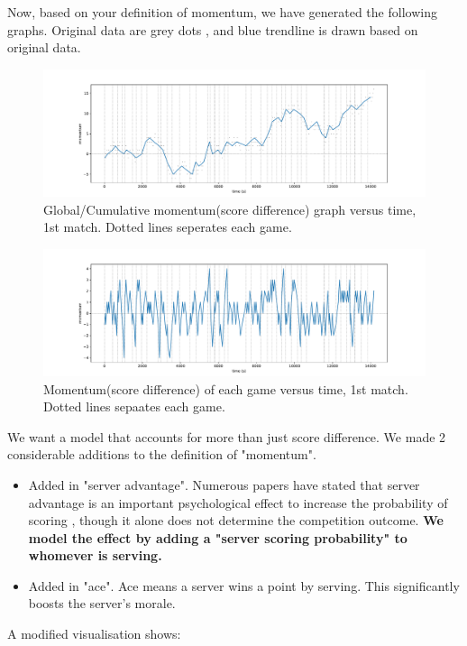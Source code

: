 \documentclass[11pt,a4paper]{article}
\begin{document}
	Now, based on your definition of momentum, we have generated the following graphs. Original data are \color{gray} grey dots \color{black}, and \color{blue}blue trendline \color{black}is drawn based on original data.
	
		
	\begin{figure}[H]
		\centering
		\includegraphics[width=1.0\linewidth]{pics/fig0_0}
		\caption{Global/Cumulative momentum(score difference) graph versus time, 1st match. Dotted lines seperates each game. }
		\label{fig:fig0_0}
	\end{figure}	
	
	\begin{figure}[H]
		\centering
		\includegraphics[width=1.0\linewidth]{pics/fig1_0}
		\caption{Momentum(score difference) of each game versus time, 1st match. Dotted lines sepaates each game.}
		\label{fig:fig10}
	\end{figure}
	
	
	We want a model that accounts for more than just score difference. We made 2 considerable additions to the definition of "momentum". 
	\begin{itemize}
		\item Added in "server advantage". Numerous papers have stated that server advantage is an important psychological effect to increase the probability of scoring\cite{Klaassen_1999} \cite{MacPhee_Pollard_2004}, though it alone does not determine the competition outcome. \textbf{We model the effect by adding a "server scoring probability" to whomever is serving.}
		\item Added in "ace". Ace means a server wins a point by serving. This significantly boosts the server's morale. 
	\end{itemize} 
	A modified visualisation shows:
	
\end{document}
